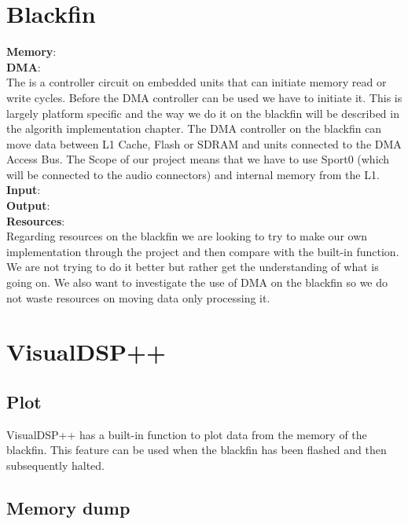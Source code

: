 \section{Blackfin}
\textbf{Memory}:\\
\textbf{DMA}:\\
The is a controller circuit on embedded units that can initiate memory read or write cycles. Before the DMA controller can be used we have to initiate it. This is largely platform specific and the way we do it on the blackfin will be described in the algorith implementation chapter. The DMA controller on the blackfin can move data between L1 Cache, Flash or SDRAM and units connected to the DMA Access Bus. The Scope of our project means that we have to use Sport0 (which will be connected to the audio connectors) and internal memory from the L1. 
\textbf{Input}:\\
\textbf{Output}:\\
\textbf{Resources}:\\
Regarding resources on the blackfin we are looking to try to make our own implementation through the project and then compare with the built-in function. We are not trying to do it better but rather get the understanding of what is going on.
We also want to investigate the use of DMA on the blackfin so we do not waste resources on moving data only processing it.
\section{VisualDSP++}
\subsection{Plot}
VisualDSP++ has a built-in function to plot data from the memory of the blackfin. This feature can be used when the blackfin has been flashed and then subsequently halted. 
\subsection{Memory dump}
